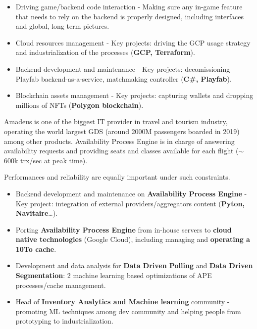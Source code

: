 \documentclass[10pt, a4paper, ragged2e]{altacv}
\begin{document}
		\smallskip
		\begin{itemize}
			\item Driving game/backend code interaction - Making sure any in-game feature that needs to rely on the backend is properly designed, including interfaces and global, long term pictures.
			\item Cloud resources management - Key projects: driving the GCP usage strategy and industrialization of the processes (\textbf{GCP, Terraform}).
			\item Backend development and maintenance - Key projects: decomissioning Playfab backend-as-a-service, matchmaking controller (\textbf{C\#, Playfab}).
			\item Blockchain assets management - Key projects: capturing wallets and dropping millions of NFTs (\textbf{Polygon blockchain}).
		\end{itemize}
	\divider

		
		Amadeus is one of the biggest IT provider in travel and tourism industry, operating the world largest GDS (around 2000M passengers boarded in 2019) among other products.
		Availability Process Engine is in charge of answering availability requests and providing seats and classes available for each flight (${\sim}$600k trx/sec at peak time).

		\smallskip
		Performances and reliability are equally important under such constraints.

		\smallskip
		\begin{itemize}
			\item Backend development and maintenance on \textbf{Availability Process Engine} - Key project: integration of external providers/aggregators content (\textbf{Pyton, Navitaire}\ldots).
			\item Porting \textbf{Availability Process Engine} from in-house servers to \textbf{cloud native technologies} (Google Cloud), including managing and \textbf{operating a 10To cache}.
			\item Development and data analysis for \textbf{Data Driven Polling} and \textbf{Data Driven Segmentation}: 2 machine learning based optimizations of APE processes/cache management.
			\item Head of \textbf{Inventory Analytics and Machine learning} community - promoting ML techniques among dev community and helping people from prototyping to industrialization.
		\end{itemize}
	\divider
\end{document}
